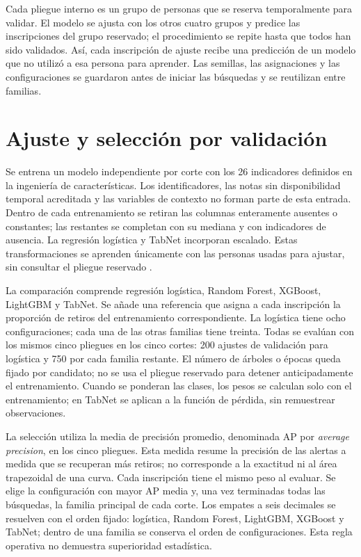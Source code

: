 Cada pliegue interno es un grupo de personas que se reserva temporalmente para validar. El modelo se ajusta con los otros cuatro grupos y predice las inscripciones del grupo reservado; el procedimiento se repite hasta que todos han sido validados. Así, cada inscripción de ajuste recibe una predicción de un modelo que no utilizó a esa persona para aprender. Las semillas, las asignaciones y las configuraciones se guardaron antes de iniciar las búsquedas y se reutilizan entre familias.

\section{Ajuste y selección por validación}
Se entrena un modelo independiente por corte con los 26 indicadores definidos en la ingeniería de características. Los identificadores, las notas sin disponibilidad temporal acreditada y las variables de contexto no forman parte de esta entrada. Dentro de cada entrenamiento se retiran las columnas enteramente ausentes o constantes; las restantes se completan con su mediana y con indicadores de ausencia. La regresión logística y TabNet incorporan escalado. Estas transformaciones se aprenden únicamente con las personas usadas para ajustar, sin consultar el pliegue reservado \cite{revsklearnpitfalls}.

La comparación comprende regresión logística, Random Forest, XGBoost, LightGBM y TabNet. Se añade una referencia que asigna a cada inscripción la proporción de retiros del entrenamiento correspondiente. La logística tiene ocho configuraciones; cada una de las otras familias tiene treinta. Todas se evalúan con los mismos cinco pliegues en los cinco cortes: 200 ajustes de validación para logística y 750 por cada familia restante. El número de árboles o épocas queda fijado por candidato; no se usa el pliegue reservado para detener anticipadamente el entrenamiento. Cuando se ponderan las clases, los pesos se calculan solo con el entrenamiento; en TabNet se aplican a la función de pérdida, sin remuestrear observaciones.

La selección utiliza la media de precisión promedio, denominada AP por \textit{average precision}, en los cinco pliegues. Esta medida resume la precisión de las alertas a medida que se recuperan más retiros; no corresponde a la exactitud ni al área trapezoidal de una curva. Cada inscripción tiene el mismo peso al evaluar. Se elige la configuración con mayor AP media y, una vez terminadas todas las búsquedas, la familia principal de cada corte. Los empates a seis decimales se resuelven con el orden fijado: logística, Random Forest, LightGBM, XGBoost y TabNet; dentro de una familia se conserva el orden de configuraciones. Esta regla operativa no demuestra superioridad estadística.

